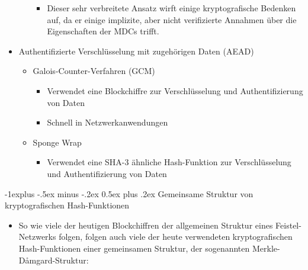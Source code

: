 \documentclass[a4paper]{article}
\makeatletter
\renewcommand{\subsection}{\@startsection{subsection}{2}{0mm}%
 {-1explus -.5ex minus -.2ex}%
 {0.5ex plus .2ex}%
 {\normalfont\normalsize\bfseries}}
\makeatother
\begin{document}
\begin{multicols}{3}
\begin{itemize}
\begin{itemize}
                        \begin{itemize}
                            \item
                                  Dieser sehr verbreitete Ansatz wirft einige kryptografische
                                  Bedenken auf, da er einige implizite, aber nicht verifizierte
                                  Annahmen über die Eigenschaften der MDCs trifft.
                        \end{itemize}
              \end{itemize}
        \item
              Authentifizierte Verschlüsselung mit zugehörigen Daten (AEAD)

              \begin{itemize}
                  \item
                        Galois-Counter-Verfahren (GCM)

                        \begin{itemize}
                            \item
                                  Verwendet eine Blockchiffre zur Verschlüsselung und
                                  Authentifizierung von Daten
                            \item
                                  Schnell in Netzwerkanwendungen
                        \end{itemize}
                  \item
                        Sponge Wrap

                        \begin{itemize}
                            \item
                                  Verwendet eine SHA-3 ähnliche Hash-Funktion zur Verschlüsselung
                                  und Authentifizierung von Daten
                        \end{itemize}
              \end{itemize}
    \end{itemize}


    \subsection{Gemeinsame Struktur von kryptografischen
        Hash-Funktionen}

    \begin{itemize}
        \item
              So wie viele der heutigen Blockchiffren der allgemeinen Struktur eines
              Feistel-Netzwerks folgen, folgen auch viele der heute verwendeten
              kryptografischen Hash-Funktionen einer gemeinsamen Struktur, der
              sogenannten Merkle-Dåmgard-Struktur:


\end{itemize}
\end{multicols}
\end{document}
